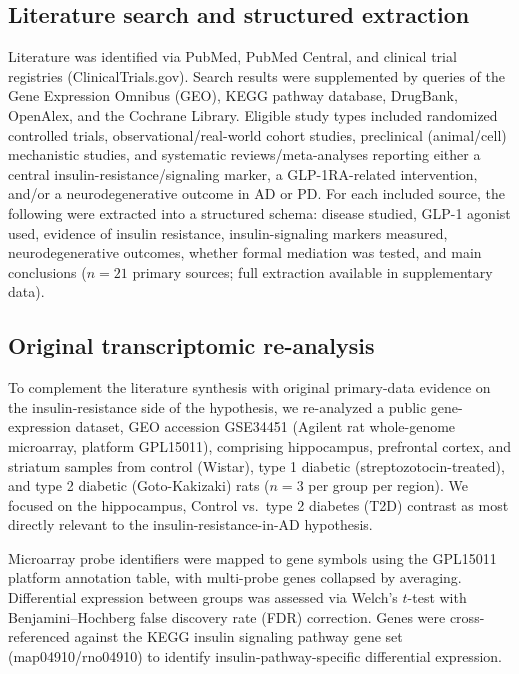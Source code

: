 \documentclass[11pt, a4paper]{article}
\begin{document}
\subsection{Literature search and structured extraction}
Literature was identified via PubMed, PubMed Central, and clinical trial
registries (ClinicalTrials.gov). Search results were supplemented by queries
of the Gene Expression Omnibus (GEO), KEGG pathway database, DrugBank,
OpenAlex, and the Cochrane Library. Eligible study types included randomized
controlled trials, observational/real-world cohort studies, preclinical
(animal/cell) mechanistic studies, and systematic reviews/meta-analyses
reporting either a central insulin-resistance/signaling marker, a
GLP-1RA-related intervention, and/or a neurodegenerative outcome in AD or
PD. For each included source, the following were extracted into a
structured schema: disease studied, GLP-1 agonist used, evidence of insulin
resistance, insulin-signaling markers measured, neurodegenerative outcomes,
whether formal mediation was tested, and main conclusions ($n = 21$ primary
sources; full extraction available in supplementary data).

\subsection{Original transcriptomic re-analysis}
To complement the literature synthesis with original primary-data evidence
on the insulin-resistance side of the hypothesis, we re-analyzed a public
gene-expression dataset, GEO accession GSE34451 (Agilent rat whole-genome
microarray, platform GPL15011), comprising hippocampus, prefrontal cortex,
and striatum samples from control (Wistar), type 1 diabetic
(streptozotocin-treated), and type 2 diabetic (Goto-Kakizaki) rats
($n=3$ per group per region). We focused on the hippocampus, Control vs.\
type 2 diabetes (T2D) contrast as most directly relevant to the
insulin-resistance-in-AD hypothesis.

Microarray probe identifiers were mapped to gene symbols using the GPL15011
platform annotation table, with multi-probe genes collapsed by averaging.
Differential expression between groups was assessed via Welch's $t$-test
with Benjamini--Hochberg false discovery rate (FDR) correction. Genes were
cross-referenced against the KEGG insulin signaling pathway gene set
(map04910/rno04910) to identify insulin-pathway-specific differential
expression. %
\end{document}
